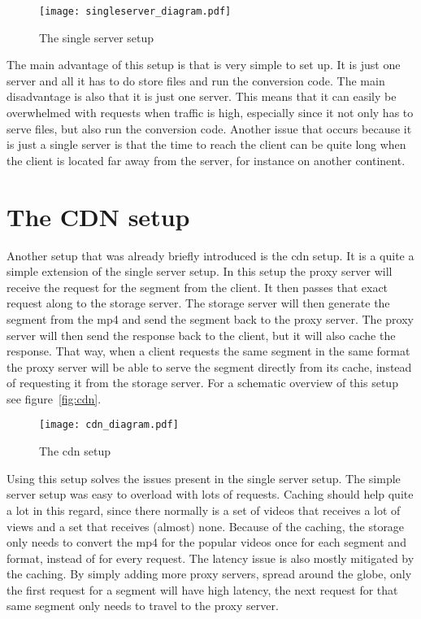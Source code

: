 \documentclass[twoside,openright]{uva-bachelor-thesis}
\begin{document}
\begin{figure}[h]
    \texttt{[image: singleserver\_diagram.pdf]}
    \caption{The single server setup}\label{fig:singleserver}
\end{figure}

The main advantage of this setup is that is very simple to set up. It is just
one server and all it has to do store files and run the conversion code. The
main disadvantage is also that it is just one server. This means that it can
easily be overwhelmed with requests when traffic is high, especially since it
not only has to serve files, but also run the conversion code. Another issue
that occurs because it is just a single server is that the time to reach the
client can be quite long when the client is located far away from the server,
for instance on another continent.



\section{The CDN setup}
Another setup that was already briefly introduced is the \gls{cdn} setup. It is
a quite a simple extension of the single server setup. In this setup the proxy
server will receive the request for the segment from the client. It then passes
that exact request along to the storage server. The storage server will then
generate the segment from the mp4 and send the segment back to the proxy server.
The proxy server will then send the response back to the client, but it will
also cache the response. That way, when a client requests the same segment in
the same format the proxy server will be able to serve the segment directly from
its cache, instead of requesting it from the storage server. For a schematic
overview of this setup see figure~\vref{fig:cdn}.

\begin{figure}[h]
    \texttt{[image: cdn\_diagram.pdf]}
    \caption{The \gls{cdn} setup}\label{fig:cdn}
\end{figure}

Using this setup solves the issues present in the single server
setup. The simple server setup was easy to overload with lots of requests.
Caching should help quite a lot in this regard, since there normally is a set of
videos that receives a lot of views and a set that receives (almost) none.
Because of the caching, the storage only needs to convert the mp4 for the
popular videos once for each segment and format, instead of for every request.
The latency issue is also mostly mitigated by the caching. By simply adding
more proxy servers, spread around the globe, only the first request for a
segment will have high latency, the next request for that same segment only
needs to travel to the proxy server.
\end{document}
